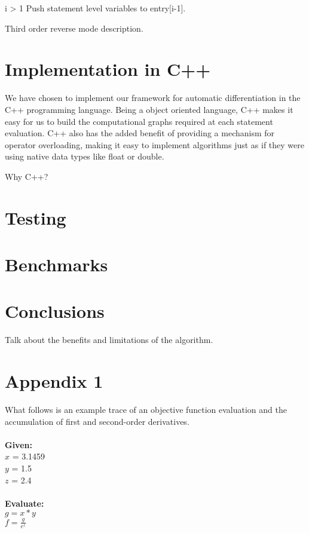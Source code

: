 \documentclass[oneside]{article}
\begin{document}
\begin{algorithm*}[!htb]
\begin{algorithmic}[1]
\begin{varwidth}[t]{\linewidth}
\end{varwidth}
\EndFor
\EndFor
\EndFor
\If i > 1
\State Push statement level variables to entry[i-1].
\EndIf
\EndFor

\end{algorithmic}
 \end{algorithm*}



\begin{editnote}
Third order reverse mode description.
\end{editnote}

\section{Implementation in C++}
We have chosen to implement our framework for automatic differentiation in the C++ programming language. Being a object oriented language, C++ makes it easy for us to build the computational graphs required at each statement evaluation. C++ also has the added benefit of providing a mechanism for operator overloading, making it easy to implement algorithms just as if they were using native data types like float or double.

\begin{editnote}
Why C++?
\end{editnote}

\section{Testing}

\section{Benchmarks}

\section{Conclusions}
\begin{editnote}
Talk about the benefits and limitations of the algorithm.
\end{editnote}

\section{Appendix 1}
What follows is an example trace of an objective function evaluation and the accumulation of first and second-order derivatives. \\
\\
\textbf{Given: } \\
$x$ = 3.1459 \\
$y$ = 1.5   \\
$z$ = 2.4  \\
\\
\textbf{Evaluate:} \\
$g = x*y$ \\
$f  = \frac{g}{e^z}$
\end{document}
